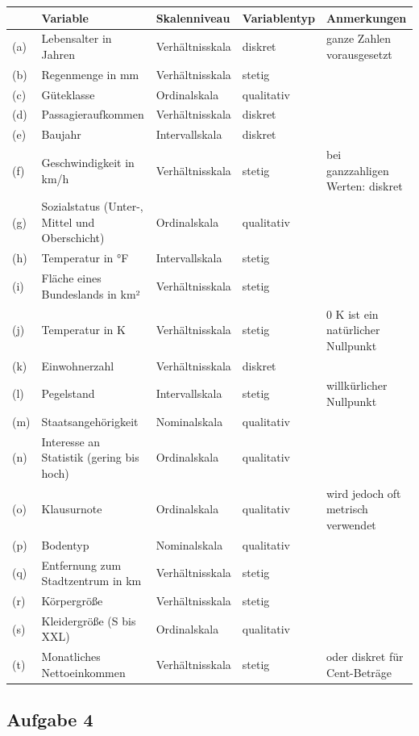 \documentclass[
  11pt,
  ngerman,
  a4paper,
]{report}
\begin{document}
\begin{table}[H]
\centering
\begin{tabular}{lllll}
\toprule
  & Variable & Skalenniveau & Variablentyp & Anmerkungen\\
\midrule
(a) & Lebensalter in Jahren & Verhältnisskala & diskret & ganze Zahlen vorausgesetzt\\
(b) & Regenmenge in mm & Verhältnisskala & stetig & \\
(c) & Güteklasse & Ordinalskala & qualitativ & \\
(d) & Passagieraufkommen & Verhältnisskala & diskret & \\
(e) & Baujahr & Intervallskala & diskret & \\
(f) & Geschwindigkeit in km/h & Verhältnisskala & stetig & bei ganzzahligen Werten: diskret\\
(g) & Sozialstatus (Unter-, Mittel und Oberschicht) & Ordinalskala & qualitativ & \\
(h) & Temperatur in °F & Intervallskala & stetig & \\
(i) & Fläche eines Bundeslands in km² & Verhältnisskala & stetig & \\
(j) & Temperatur in K & Verhältnisskala & stetig & 0 K ist ein natürlicher Nullpunkt\\
(k) & Einwohnerzahl & Verhältnisskala & diskret & \\
(l) & Pegelstand & Intervallskala & stetig & willkürlicher Nullpunkt\\
(m) & Staatsangehörigkeit & Nominalskala & qualitativ & \\
(n) & Interesse an Statistik (gering bis hoch) & Ordinalskala & qualitativ & \\
(o) & Klausurnote & Ordinalskala & qualitativ & wird jedoch oft metrisch verwendet\\
(p) & Bodentyp & Nominalskala & qualitativ & \\
(q) & Entfernung zum Stadtzentrum in km & Verhältnisskala & stetig & \\
(r) & Körpergröße & Verhältnisskala & stetig & \\
(s) & Kleidergröße (S bis XXL) & Ordinalskala & qualitativ & \\
(t) & Monatliches Nettoeinkommen & Verhältnisskala & stetig & oder diskret für Cent-Beträge\\
\bottomrule
\end{tabular}
\end{table}

\hypertarget{aufgabe-4-2}{%
\subsection{Aufgabe 4}\label{aufgabe-4-2}}
\end{document}
